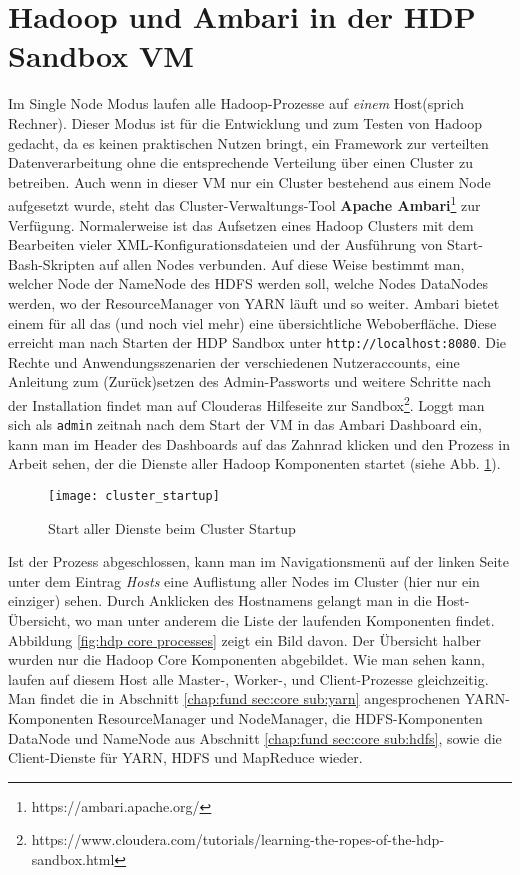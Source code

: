\section{Hadoop und Ambari in der HDP Sandbox VM}
Im Single Node Modus laufen alle Hadoop-Prozesse auf \textit{einem} Host(sprich Rechner). Dieser Modus ist für die Entwicklung und zum Testen von Hadoop gedacht, da es keinen praktischen Nutzen bringt, ein Framework zur verteilten Datenverarbeitung ohne die entsprechende Verteilung über einen Cluster zu betreiben. Auch wenn in dieser VM nur ein Cluster bestehend aus einem Node aufgesetzt wurde, steht das Cluster-Verwaltungs-Tool \textbf{Apache Ambari}\footnote{https://ambari.apache.org/} zur Verfügung. Normalerweise ist das Aufsetzen eines Hadoop Clusters mit dem Bearbeiten vieler XML-Konfigurationsdateien und der Ausführung von Start-Bash-Skripten auf allen Nodes verbunden. Auf diese Weise bestimmt man, welcher Node der NameNode des HDFS werden soll, welche Nodes DataNodes werden, wo der ResourceManager von YARN läuft und so weiter. Ambari bietet einem für all das (und noch viel mehr) eine übersichtliche Weboberfläche. Diese erreicht man nach Starten der HDP Sandbox unter \verb|http://localhost:8080|. Die Rechte und Anwendungsszenarien der verschiedenen Nutzeraccounts, eine Anleitung zum (Zurück)setzen des Admin-Passworts und weitere Schritte nach der Installation findet man auf Clouderas Hilfeseite zur Sandbox\footnote{https://www.cloudera.com/tutorials/learning-the-ropes-of-the-hdp-sandbox.html}. Loggt man sich als \verb|admin| zeitnah nach dem Start der VM in das Ambari Dashboard ein, kann man im Header des Dashboards auf das Zahnrad klicken und den Prozess in Arbeit sehen, der die Dienste aller Hadoop Komponenten startet (siehe Abb. \ref{fig:cluster startup}). 

\begin{figure}[ht]
    \centering
    \texttt{[image: cluster\_startup]}
    \caption[Start aller Prozesse beim Cluster Startup]{Start aller Dienste beim Cluster Startup}
    \label{fig:cluster startup}
\end{figure}

Ist der Prozess abgeschlossen, kann man im Navigationsmenü auf der linken Seite unter dem Eintrag \textit{Hosts} eine Auflistung aller Nodes im Cluster (hier nur ein einziger) sehen. Durch Anklicken des Hostnamens gelangt man in die Host-Übersicht, wo man unter anderem die Liste der laufenden Komponenten findet. Abbildung \ref{fig:hdp core processes} zeigt ein Bild davon. Der Übersicht halber wurden nur die Hadoop Core Komponenten abgebildet. Wie man sehen kann, laufen auf diesem Host alle Master-, Worker-, und Client-Prozesse gleichzeitig. Man findet die in Abschnitt \ref{chap:fund sec:core sub:yarn} angesprochenen YARN-Komponenten ResourceManager und NodeManager, die HDFS-Komponenten DataNode und NameNode aus Abschnitt \ref{chap:fund sec:core sub:hdfs}, sowie die Client-Dienste für YARN, HDFS und MapReduce wieder. 

